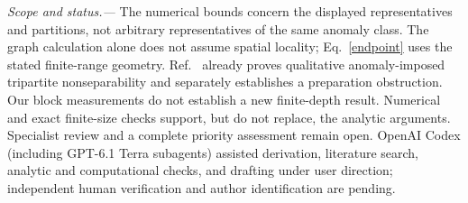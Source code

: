 \documentclass[aps,prl,reprint,nofootinbib]{revtex4-2}
\begin{document}
\emph{Scope and status.---} The numerical bounds concern the displayed
representatives and partitions, not arbitrary representatives of the same
anomaly class. The graph calculation alone does not assume spatial
locality; Eq.~\eqref{endpoint} uses the stated finite-range geometry.
Ref.~\cite{LCW} already proves qualitative anomaly-imposed tripartite
nonseparability and separately establishes a preparation obstruction. Our
block measurements do not establish a new finite-depth result. Numerical
and exact finite-size checks support, but do not replace, the analytic
arguments. Specialist review and a complete priority assessment remain
open. OpenAI Codex (including GPT-6.1 Terra subagents) assisted derivation,
literature search, analytic and computational checks, and drafting under
user direction; independent human verification and author identification
are pending.
\end{document}
